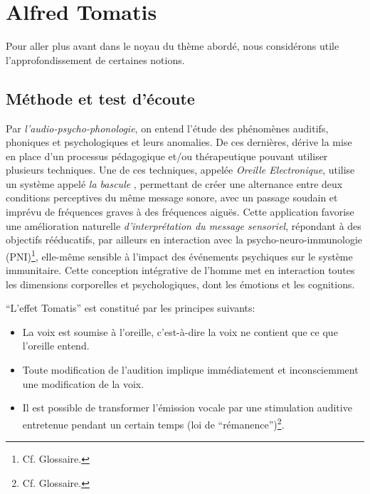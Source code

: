 \chapter{Alfred Tomatis}


Pour aller plus avant dans le noyau du thème abordé, nous considérons utile
l'approfondissement de certaines notions.
\section{Méthode et test d'écoute}

Par {\textit{l'audio-psycho-phonologie}}, on entend l'étude des
phénomènes auditifs, phoniques et psychologiques et leurs anomalies.
De ces dernières,  dérive la mise en place d'un processus pédagogique
et/ou thérapeutique pouvant
utiliser plusieurs techniques.
Une de ces techniques,
  appelée
\label{outil_oreille_electro}
\textit{Oreille Electronique}, utilise
un système appelé \textit{ la
bascule} \autocite{escera-key}, permettant de créer une alternance entre deux conditions perceptives
du même message sonore, avec un passage soudain et imprévu de fréquences graves à des
fréquences aiguës.
Cette application favorise une amélioration naturelle \emph{d'interprétation du message
sensoriel}, répondant à des objectifs rééducatifs, par ailleurs en
interaction avec la psycho-neuro-immunologie (\gls{PNI})\footnote{Cf. Glossaire.}, elle-même sensible à
l'impact des événements psychiques sur le système immunitaire.
Cette conception intégrative de l'homme met en interaction toutes les
dimensions corporelles et psychologiques, dont les émotions et les cognitions.


``L'effet Tomatis'' est constitué par les principes suivants:
\begin{itemize}
	\item La voix est soumise à l'oreille, c'est-à-dire la voix ne contient que ce que l'oreille entend.
	\item Toute modification de l'audition implique immédiatement
          et inconsciemment une
          modification de la voix.
	\item Il est possible de transformer l'émission vocale par une stimulation
auditive
		entretenue pendant un certain temps (loi de
               ``\gls{rémanence}'')\footnote{Cf. Glossaire.}.

\end{itemize}

